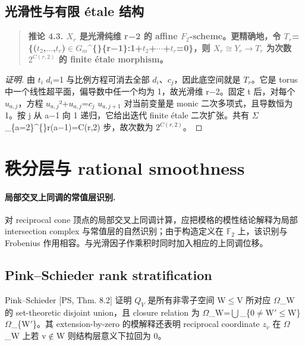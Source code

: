 \documentclass[11pt]{ctexart}
\begin{document}
\subsection{光滑性与有限 étale 结构}

\begin{quote}\textbf{推论 4.3. \ensuremath{X_{r}} 是光滑纯维 r−2 的 affine \ensuremath{F_2}-scheme。更精确地，令 \ensuremath{T_{r}}=\{(\ensuremath{t_2},\ensuremath{\ldots},\ensuremath{t_{r}})\ensuremath{\in}\ensuremath{G_{m}}\textasciicircum\{\}\{r−1\}:1+\ensuremath{t_2}+\ensuremath{\cdots}+\ensuremath{t_{r}}=0\}，则 \ensuremath{X_{r}}\ensuremath{\cong}\ensuremath{Y_{r}}\ensuremath{\to}\ensuremath{T_{r}} 为次数 \ensuremath{2^{C(r,2)}} 的 finite étale morphism。}\end{quote}

\begin{proof}[证明] 

由 \ensuremath{t_{i}} \ensuremath{d_{i}}=1 与比例方程可消去全部 \ensuremath{d_{i}}、\ensuremath{c_{j}}，因此底空间就是 \ensuremath{T_{r}}。它是 torus 中一个线性超平面，偏导数中任一个均为 1，故光滑维 r−2。固定 t 后，对每个 \ensuremath{u_{a,j}}，方程 \ensuremath{u_{a,j}}²+\ensuremath{u_{a,j}}=\ensuremath{c_{j}} \ensuremath{u_{a,j+1}} 对当前变量是 monic 二次多项式，且导数恒为 1。按 j 从 a−1 向 1 递归，它给出迭代 finite étale 二次扩张。共有 \ensuremath{\Sigma}\_\{a=2\}\textasciicircum\{\}r(a−1)=C(r,2) 步，故次数为 \ensuremath{2^{C(r,2)}}。

\end{proof}

\section{秩分层与 rational smoothness}

\paragraph{局部交叉上同调的常值层识别.} 对 reciprocal cone 顶点的局部交叉上同调计算，应把模格的模性结论解释为局部 intersection complex 与常值层的自然识别；由于构造定义在 $\mathbb F_2$ 上，该识别与 Frobenius 作用相容。与光滑因子作乘积时同时加入相应的上同调位移。

\subsection{Pink–Schieder rank stratification}

Pink–Schieder [PS, Thm. 8.2] 证明 \ensuremath{Q_{V}} 是所有非零子空间 W\ensuremath{\le}V 所对应 \ensuremath{\Omega}\_W 的 set-theoretic disjoint union，且 closure relation 为 \ensuremath{\Omega}̄\_W=\ensuremath{\bigcup}\_\{0\ensuremath{\ne}W\ensuremath{\prime}\ensuremath{\le}W\}\ensuremath{\Omega}\_\{W\ensuremath{\prime}\}。其 extension-by-zero 的模解释还表明 reciprocal coordinate \ensuremath{z_{v}} 在 \ensuremath{\Omega}\_W 上若 v\ensuremath{\notin}W 则结构层意义下拉回为 0。
\end{document}
